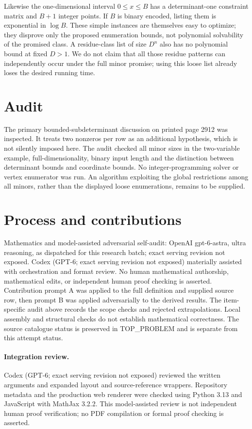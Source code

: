 \documentclass[11pt]{article}
\begin{document}
Likewise the one-dimensional interval $0\le x\le B$ has a
determinant-one constraint matrix and $B+1$ integer points. If
$B$ is binary encoded, listing them is exponential in $\log B$.
These simple instances are themselves easy to optimize; they disprove
only the proposed enumeration bounds, not polynomial solvability of
the promised class. A residue-class list of size $D^n$ also has
no polynomial bound at fixed $D>1$. We do not claim that all
those residue patterns can independently occur under the full minor
promise; using this loose list already loses the desired running time.

\section{Audit}
The primary bounded-subdeterminant discussion on printed page 2912
was inspected. It treats two nonzeros per row as an additional
hypothesis, which is not silently imposed here. The audit checked
all minor sizes in the two-variable example, full-dimensionality,
binary input length and the distinction between determinant bounds
and coordinate bounds. No integer-programming solver or vertex
enumerator was run. An algorithm exploiting the global restrictions
among all minors, rather than the displayed loose enumerations,
remains to be supplied.

\section{Process and contributions}
Mathematics and model-assisted adversarial self-audit: OpenAI gpt-6-astra, ultra reasoning, as dispatched for this research batch; exact serving revision not exposed. Codex (GPT-6; exact serving revision not exposed) materially assisted with orchestration and format review. No human mathematical authorship, mathematical edits, or independent human proof checking is asserted.
Contribution prompt A was applied to the full definition and supplied source row, then prompt B was applied adversarially to the derived results. The item-specific audit above records the scope checks and rejected extrapolations. Local assembly and structural checks do not establish mathematical correctness. The source catalogue status is preserved in TOP\_PROBLEM and is separate from this attempt status.
\paragraph{Integration review.} Codex (GPT-6; exact serving revision not exposed) reviewed the written arguments and expanded layout and source-reference wrappers. Repository metadata and the production web renderer were checked using Python 3.13 and JavaScript with MathJax 3.2.2. This model-assisted review is not independent human proof verification; no PDF compilation or formal proof checking is asserted.
\end{document}

